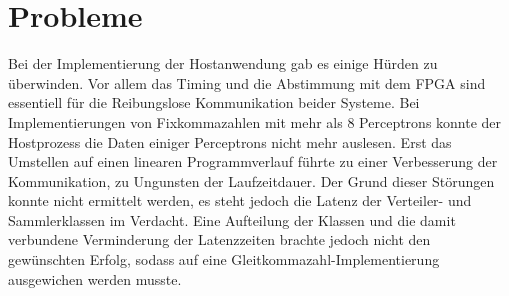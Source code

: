 \section{Probleme}
Bei der Implementierung der Hostanwendung gab es einige Hürden zu überwinden. Vor allem das Timing und die Abstimmung mit dem FPGA sind essentiell für die Reibungslose Kommunikation beider Systeme. Bei Implementierungen von Fixkommazahlen mit mehr als 8 Perceptrons konnte der Hostprozess die Daten einiger Perceptrons nicht mehr auslesen. Erst das Umstellen auf einen linearen Programmverlauf führte zu einer Verbesserung der Kommunikation, zu Ungunsten der Laufzeitdauer. Der Grund dieser Störungen konnte nicht ermittelt werden, es steht jedoch die Latenz der Verteiler- und Sammlerklassen im Verdacht. Eine Aufteilung der Klassen und die damit verbundene Verminderung der Latenzzeiten brachte jedoch nicht den gewünschten Erfolg, sodass auf eine Gleitkommazahl-Implementierung ausgewichen werden musste.